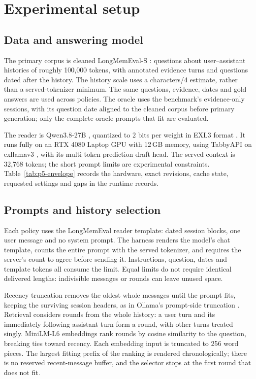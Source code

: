 \documentclass[11pt,letterpaper]{article}
\newcommand{\PfiveHistoryTokens}{100,000}
\newcommand{\PfiveGpuMemory}{12}
\newcommand{\PfiveBits}{2}
\newcommand{\PfiveContext}{32,768}
\newcommand{\PfiveEmbeddingTokens}{256}
\begin{document}
\section{Experimental setup}
\label{sec:setup}

\subsection{Data and answering model}
The primary corpus is cleaned LongMemEval-S \citep{wu2025longmemeval}:
\PfNMFour{} questions about user--assistant histories of roughly
\PfiveHistoryTokens{} tokens, with annotated evidence turns and questions dated
after the history. The history scale uses a characters/4 estimate, rather than
a served-tokenizer minimum. The same questions, evidence, dates and gold answers are
used across policies. The oracle uses the benchmark's evidence-only sessions,
with its question date aligned to the cleaned corpus before primary generation;
only the \PfiveOFitN{} complete oracle prompts that fit are evaluated.

The reader is Qwen3.8-27B \citep{qwen2026qwen38card}, quantized to
\PfiveBits{} bits per weight in EXL3 format \citep{turboderp2026qwen38exl3}.
It runs fully on an RTX 4080 Laptop GPU with \PfiveGpuMemory{}\,GB memory,
using TabbyAPI on exllamav3 \citep{theroyallab2025tabbyapi,turboderp2025exllamav3},
with its multi-token-prediction draft head. The served context is
\PfiveContext{} tokens; the short prompt limits are experimental constraints.
Table~\ref{tab:p5-envelope} records the hardware, exact revisions, cache state,
requested settings and gaps in the runtime records.

\subsection{Prompts and history selection}
Each policy uses the LongMemEval reader template: dated session blocks, one
user message and no system prompt. The harness renders the model's chat
template, counts the entire prompt with the served tokenizer, and requires the
server's count to agree before sending it. Instructions, question, dates and
template tokens all consume the limit. Equal limits do not require identical
delivered lengths: indivisible messages or rounds can leave unused space.

Recency truncation removes the oldest whole messages until the prompt fits,
keeping the surviving session headers, as in Ollama's prompt-side truncation
\citep{ollama_chatprompt}. Retrieval considers rounds from the whole history:
a user turn and its immediately following assistant turn form a round, with
other turns treated singly. MiniLM-L6 embeddings
\citep{wang2020minilm,reimers2019sbert} rank rounds by cosine similarity to the
question, breaking ties toward recency. Each embedding input is truncated to
\PfiveEmbeddingTokens{} word pieces. The largest fitting prefix of the ranking
is rendered chronologically; there is no reserved recent-message buffer, and
the selector stops at the first round that does not fit.
\end{document}
